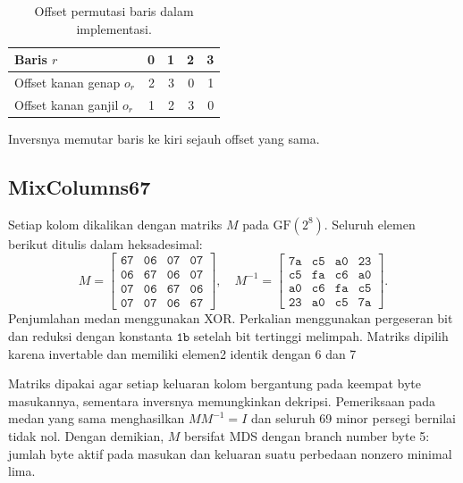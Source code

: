 \begin{table}[htbp]
  \centering
  \caption{Offset permutasi baris dalam implementasi.}
  \begin{tabular}{@{}lrrrr@{}}
    \toprule Baris $r$ & 0 & 1 & 2 & 3\\
    \midrule Offset kanan genap $o_r$ & 2 & 3 & 0 & 1\\
    \midrule Offset kanan ganjil $o_r$ & 1 & 2 & 3 & 0\\
    \bottomrule
  \end{tabular}
\end{table}
Inversnya memutar baris ke kiri sejauh offset yang sama.

\subsection{MixColumns67}
Setiap kolom dikalikan dengan matriks $M$ pada $\mathrm{GF}(2^8)$.
Seluruh elemen berikut ditulis dalam heksadesimal:
\begin{equation}
  M=\begin{bmatrix}
    \mathtt{67}&\mathtt{06}&\mathtt{07}&\mathtt{07}\\
    \mathtt{06}&\mathtt{67}&\mathtt{06}&\mathtt{07}\\
    \mathtt{07}&\mathtt{06}&\mathtt{67}&\mathtt{06}\\
    \mathtt{07}&\mathtt{07}&\mathtt{06}&\mathtt{67}
  \end{bmatrix},\quad
  M^{-1}=\begin{bmatrix}
    \mathtt{7a}&\mathtt{c5}&\mathtt{a0}&\mathtt{23}\\
    \mathtt{c5}&\mathtt{fa}&\mathtt{c6}&\mathtt{a0}\\
    \mathtt{a0}&\mathtt{c6}&\mathtt{fa}&\mathtt{c5}\\
    \mathtt{23}&\mathtt{a0}&\mathtt{c5}&\mathtt{7a}
  \end{bmatrix}.
\end{equation}
Penjumlahan medan menggunakan XOR. Perkalian menggunakan pergeseran bit
dan reduksi dengan konstanta $\mathtt{1b}$ setelah bit tertinggi melimpah. Matriks dipilih karena invertable dan memiliki elemen2 identik dengan 6 dan 7

Matriks dipakai agar setiap keluaran kolom bergantung pada keempat byte
masukannya, sementara inversnya memungkinkan dekripsi. Pemeriksaan pada
medan yang sama menghasilkan $MM^{-1}=I$ dan seluruh 69 minor persegi
bernilai tidak nol. Dengan demikian, $M$ bersifat MDS dengan branch number
byte 5: jumlah byte aktif pada masukan dan keluaran suatu perbedaan
nonzero minimal lima.

